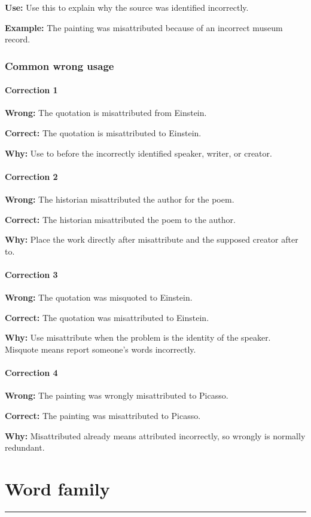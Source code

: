 \documentclass[11pt]{article}
\newcommand{\sectionrule}{\par\vspace{-0.5em}\noindent\textcolor{Accent}{\rule{\linewidth}{0.6pt}}\par}
\begin{document}
\textbf{Use:} Use this to explain why the source was identified incorrectly.

\textbf{Example:} The painting was misattributed because of an incorrect museum record.

\subsubsection{Common wrong usage}
\paragraph{Correction 1}
\textbf{Wrong:} The quotation is misattributed from Einstein.

\textbf{Correct:} The quotation is misattributed to Einstein.

\textbf{Why:} Use to before the incorrectly identified speaker, writer, or creator.

\paragraph{Correction 2}
\textbf{Wrong:} The historian misattributed the author for the poem.

\textbf{Correct:} The historian misattributed the poem to the author.

\textbf{Why:} Place the work directly after misattribute and the supposed creator after to.

\paragraph{Correction 3}
\textbf{Wrong:} The quotation was misquoted to Einstein.

\textbf{Correct:} The quotation was misattributed to Einstein.

\textbf{Why:} Use misattribute when the problem is the identity of the speaker. Misquote means report someone's words incorrectly.

\paragraph{Correction 4}
\textbf{Wrong:} The painting was wrongly misattributed to Picasso.

\textbf{Correct:} The painting was misattributed to Picasso.

\textbf{Why:} Misattributed already means attributed incorrectly, so wrongly is normally redundant.

\section{Word family}
\sectionrule
\end{document}
